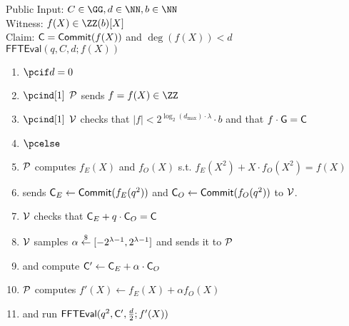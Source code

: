 \documentclass[12pt]{article}
\theoremstyle{Definition}
\begin{document}
\label{sec:oddeven}
\begin{mdframed}
Public Input: $C\in \GG, d \in \NN, b\in \NN$\\
Witness: $f(X) \in \ZZ(b)[X]$ \\
Claim: $\mathsf{C} =\textsf{{Commit}}(f(X))$ and $\deg(f(X))<d$	\\
$\textsf{FFTEval}(q,C,d;f(X))$
\begin{enumerate}[nolistsep]
		\item $\pcif d=0$
		\item $\pcind[1]$ $\mathcal{P}$ sends $f=f(X) \in \ZZ$
		\item $\pcind[1]$ $\mathcal{V}$ checks that $|f|<2^{\log_2(d_{\max}) \cdot \lambda} \cdot b$ and that $f \cdot \mathsf{G}=\mathsf{C}$
		\item $\pcelse$
		\item $\mathcal{P}$ computes $f_E(X)$ and $f_O(X)$ s.t. $f_E(X^2)+X \cdot f_O(X^2)=f(X)$ 
		\item \prover sends $\mathsf{C}_E\gets \textsf{{Commit}}(f_E(q^2))$ and $\mathsf{C}_O\gets \textsf{{Commit}}(f_O(q^2))$ to $\mathcal{V}$. 
		\item $\mathcal{V}$ checks that $\mathsf{C}_E+ q\cdot \mathsf{C}_O=\mathsf{C}$ 
		\item $\mathcal{V}$ samples $\alpha \overset{\$}{\gets} [-2^{\lambda-1},2^{\lambda-1}]$ and sends it to $\mathcal{P}$
		\item \prover and \verifier compute $\mathsf{C}'\gets \mathsf{C}_E+\alpha \cdot \mathsf{C}_O$
		\item $\mathcal{P}$ computes $f'(X)\gets f_E(X)+\alpha f_O(X)$
		\item \prover and \verifier run $\textsf{FFTEval}(q^2,\mathsf{C}',\frac{d}{2};f'(X))$
	\end{enumerate}
\end{mdframed}
\end{document}
